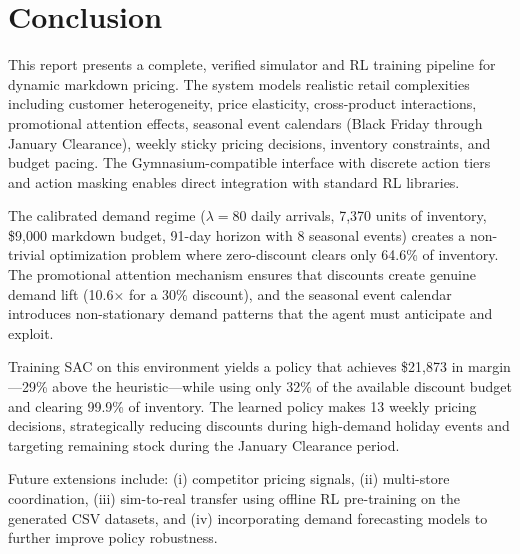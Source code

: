 \documentclass[11pt,a4paper]{article}
\begin{document}
\section{Conclusion}

This report presents a complete, verified simulator and RL training pipeline for dynamic markdown pricing.
The system models realistic retail complexities including customer heterogeneity, price elasticity, cross-product interactions, promotional attention effects, seasonal event calendars (Black Friday through January Clearance), weekly sticky pricing decisions, inventory constraints, and budget pacing.
The Gymnasium-compatible interface with discrete action tiers and action masking enables direct integration with standard RL libraries.

The calibrated demand regime ($\lambda=80$ daily arrivals, 7,370 units of inventory, \$9,000 markdown budget, 91-day horizon with 8 seasonal events) creates a non-trivial optimization problem where zero-discount clears only 64.6\% of inventory.
The promotional attention mechanism ensures that discounts create genuine demand lift (10.6$\times$ for a 30\% discount), and the seasonal event calendar introduces non-stationary demand patterns that the agent must anticipate and exploit.

Training SAC on this environment yields a policy that achieves \$21,873 in margin---29\% above the heuristic---while using only 32\% of the available discount budget and clearing 99.9\% of inventory.
The learned policy makes 13 weekly pricing decisions, strategically reducing discounts during high-demand holiday events and targeting remaining stock during the January Clearance period.

Future extensions include: (i) competitor pricing signals, (ii) multi-store coordination, (iii) sim-to-real transfer using offline RL pre-training on the generated CSV datasets, and (iv) incorporating demand forecasting models to further improve policy robustness.
\end{document}
